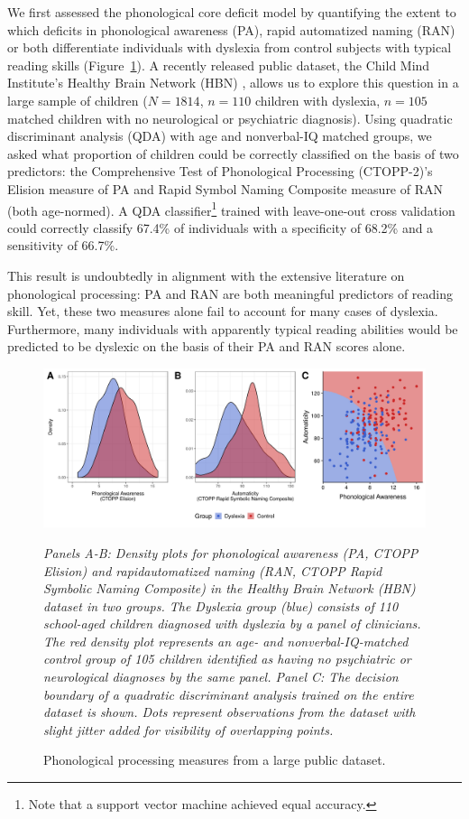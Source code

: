 \documentclass[../uwthesis.tex]{subfiles}
\begin{document}
We first assessed the phonological core deficit model by quantifying the extent to which deficits in phonological awareness (PA), rapid automatized naming (RAN) or both differentiate individuals with dyslexia from control subjects with typical reading skills (Figure~\ref{fig:p3_fig1}). A recently released public dataset, the Child Mind Institute’s Healthy Brain Network (HBN) \citep{Alexander2017DataDisorders}, allows us to explore this question in a large sample of children ($N = 1814$, $n = 110$ children with dyslexia, $n = 105$ matched children with no neurological or psychiatric diagnosis). Using quadratic discriminant analysis (QDA) with age and nonverbal-IQ matched groups, we asked what proportion of children could be correctly classified on the basis of two predictors: the Comprehensive Test of Phonological Processing (CTOPP-2)’s Elision measure of PA and Rapid Symbol Naming Composite measure of RAN (both age-normed). A QDA classifier\footnote{Note that a support vector machine achieved equal accuracy.} trained with leave-one-out cross validation could correctly classify 67.4\% of individuals with a specificity of 68.2\% and a sensitivity of 66.7\%.

This result is undoubtedly in alignment with the extensive literature on phonological
processing: PA and RAN are both meaningful predictors of reading skill. Yet, these two
measures alone fail to account for many cases of dyslexia. Furthermore, many individuals with apparently typical reading abilities would be predicted to be dyslexic on the basis of their PA and RAN scores alone.

\begin{figure}
    \centering
    \caption{Phonological processing measures from a large public dataset.}
    \label{fig:p3_fig1}
    \includegraphics[width=18cm]{images/paper_3/1_HBN_Groups.png}
    \item \textit{Panels A-B: Density plots for phonological awareness (PA, CTOPP Elision) and rapidautomatized naming (RAN, CTOPP Rapid Symbolic Naming Composite) in the Healthy Brain Network (HBN) dataset in two groups. The Dyslexia group (blue) consists of 110 school-aged children diagnosed with dyslexia by a panel of clinicians. The red density plot represents an age- and nonverbal-IQ-matched control group of 105 children identified as having no psychiatric or neurological diagnoses by the same panel. Panel C: The decision boundary of a quadratic discriminant analysis trained on the entire dataset is shown. Dots represent observations from the dataset with slight jitter added for visibility of overlapping points.}

\end{figure}
\end{document}
